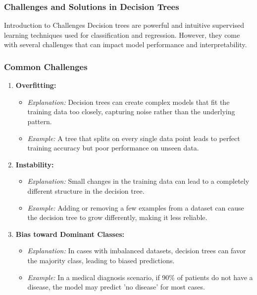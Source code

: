 \documentclass[aspectratio=169]{beamer}
\begin{document}
\begin{frame}[fragile]
    \frametitle{Challenges and Solutions in Decision Trees}

    \begin{block}{Introduction to Challenges}
        Decision trees are powerful and intuitive supervised learning techniques used for classification and regression. However, they come with several challenges that can impact model performance and interpretability.
    \end{block}
\end{frame}

\begin{frame}[fragile]
    \frametitle{Common Challenges}

    \begin{enumerate}
        \item \textbf{Overfitting:}
            \begin{itemize}
                \item \textit{Explanation:} Decision trees can create complex models that fit the training data too closely, capturing noise rather than the underlying pattern.
                \item \textit{Example:} A tree that splits on every single data point leads to perfect training accuracy but poor performance on unseen data.
            \end{itemize}

        \item \textbf{Instability:}
            \begin{itemize}
                \item \textit{Explanation:} Small changes in the training data can lead to a completely different structure in the decision tree.
                \item \textit{Example:} Adding or removing a few examples from a dataset can cause the decision tree to grow differently, making it less reliable.
            \end{itemize}

        \item \textbf{Bias toward Dominant Classes:}
            \begin{itemize}
                \item \textit{Explanation:} In cases with imbalanced datasets, decision trees can favor the majority class, leading to biased predictions.
                \item \textit{Example:} In a medical diagnosis scenario, if 90\% of patients do not have a disease, the model may predict 'no disease' for most cases.
            \end{itemize}


\end{enumerate}
\end{frame}
\end{document}
